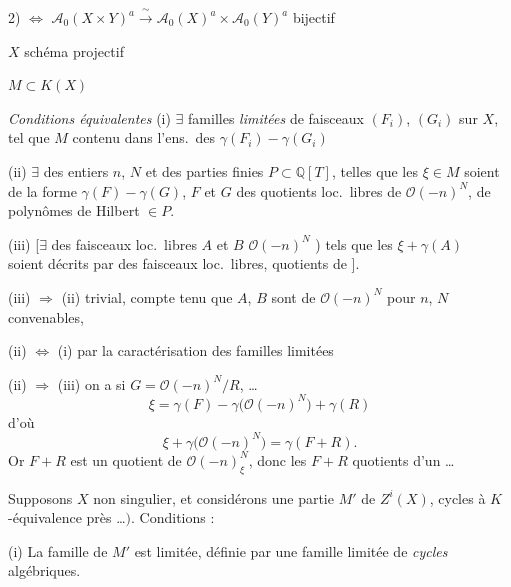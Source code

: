 \documentclass[11pt,a4paper]{article}
\begin{document}
2) $\Longleftrightarrow$ \quad $\mathcal{A}_{0}(X \times Y)^{a}
\xrightarrow{\ \sim\ } \mathcal{A}_{0}(X)^{a} \times \mathcal{A}_{0}(Y)^{a}$
\quad bijectif

$X$ schéma projectif

$M \subset K(X)$

\emph{Conditions équivalentes} \quad (i) $\exists$ familles
\emph{limitées} de faisceaux  $(F_{i})$, $(G_{i})$ sur
$X$, tel que $M$ contenu dans l'ens.\ des $\gamma(F_{i}) - \gamma(G_{i})$

(ii) $\exists$ des entiers $n$, $N$ et des parties finies
 $P \subset \mathbb{Q}[T]$, telles que les
$\xi \in M$ soient de la forme $\gamma(F) - \gamma(G)$, $F$ et $G$ des
quotients loc.\ libres de $\mathcal{O}(-n)^{N}$, de polynômes de Hilbert
$\in P$.


(iii) [$\exists$ des faisceaux loc.\ libres $A$ et $B$ \ill{}
$\mathcal{O}(-n)^{N}$ \ill{} \ill{}) tels que les
$\xi + \gamma(A)$ \  soient décrits par des
faisceaux loc.\ libres, quotients de ].

(iii) $\Longrightarrow$ (ii) trivial, compte tenu que $A$, $B$ sont
 de $\mathcal{O}(-n)^{N}$ pour $n$, $N$ convenables,

(ii) $\Longleftrightarrow$ (i) par la caractérisation des familles limitées

(ii) $\Longrightarrow$ (iii) \quad on a si $G = \mathcal{O}(-n)^{N}/R$, …
\[
\xi = \gamma(F) - \gamma\bigl(\mathcal{O}(-n)^{N}\bigr) + \gamma(R)
\]
d'où
\[
\xi + \gamma\bigl(\mathcal{O}(-n)^{N}\bigr) = \gamma(F + R).
\]
Or $F + R$ est un quotient de $\mathcal{O}(-n)^{N}_{\xi}$, donc
les $F + R$  quotients d'un …

Supposons  $X$ non singulier, et considérons  une
partie $M'$ de $Z^{i}(X)$, \ill{}  cycles à
$K$-équivalence près …$)$. Conditions  :

(i) \struck{$\exists$} La famille de $M'$ est limitée, 
définie par une famille limitée de \emph{cycles} algébriques.
\end{document}
